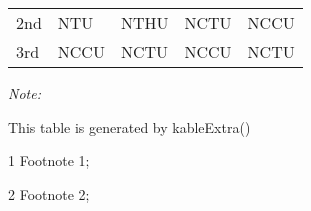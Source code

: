 \begin{table}
\begin{threeparttable}
\begin{tabular}[t]{lllll}
\hspace{1em}2nd & NTU & NTHU & NCTU & NCCU\\
\hspace{1em}3rd & NCCU & NCTU & NCCU & NCTU\\
\bottomrule
\end{tabular}
\begin{tablenotes}
\item \textit{Note: } 
\item This table is generated by kableExtra()
\item[1] Footnote 1; 
\item[2] Footnote 2; 
\end{tablenotes}
\end{threeparttable}
\end{table}
